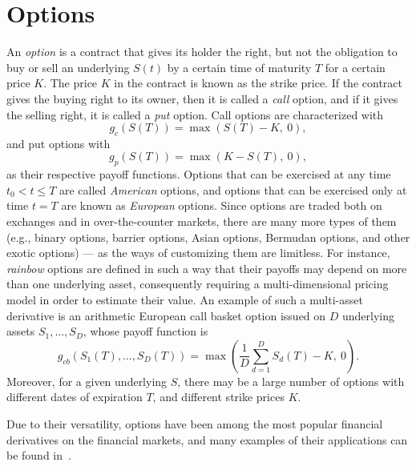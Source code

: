 \documentclass{UUThesisTemplate}
\begin{document}
%
\section{Options}
\label{sec:options}

\par
An \emph{option} is a contract that gives its holder the right, but not the obligation to buy or sell an underlying $S(t)$ by a certain time of maturity $T$ for a certain price $K$. The price $K$ in the contract is known as the strike price. If the contract gives the buying right to its owner, then it is called a \emph{call} option, and if it gives the selling right, it is called a \emph{put} option. Call options are characterized with 
\begin{equation}
\label{eq:callop}
g_c(S(T))=\max(S(T)-K,\ 0),
\end{equation}
and put options with 
\begin{equation}
\label{eq:putop}
g_p(S(T))=\max(K-S(T),\ 0),
\end{equation}
as their respective payoff functions. Options that can be exercised at any time $t_0 < t \leq T$ are called \emph{American} options, and options that can be exercised only at time $t=T$ are known as \emph{European} options. Since options are traded both on exchanges and in over-the-counter markets, there are many more types of them (e.g., binary options, barrier options, Asian options, Bermudan options, and other exotic options) --- as the ways of customizing them are limitless. For instance, \emph{rainbow} options are defined in such a way that their payoffs may depend on more than one underlying asset, consequently requiring a multi-dimensional pricing model in order to estimate their value. An example of such a multi-asset derivative is an arithmetic European call basket option issued on $D$ underlying assets $S_1,\ldots,S_D$, whose payoff function is 
\begin{equation}
\label{eq:basketop}
g_{cb}(S_1(T),\ldots,S_D(T)) = \max\left(\frac{1}{D}\sum_{d=1}^D S_d(T) - K,\ 0\right).
\end{equation}
Moreover, for a given underlying $S$, there may be a large number of options with different dates of expiration $T$, and different strike prices $K$.

\par
Due to their versatility, options have been among the most popular financial derivatives on the financial markets, and many examples of their applications can be found in~\cite{hull2017options}.
%
%
\end{document}
